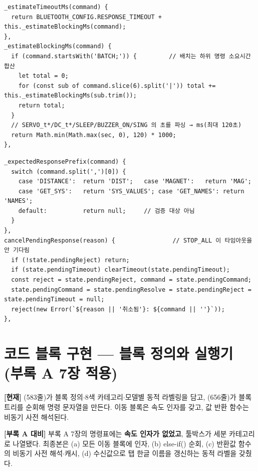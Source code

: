 \begin{verbatim}
_estimateTimeoutMs(command) {
  return BLUETOOTH_CONFIG.RESPONSE_TIMEOUT + this._estimateBlockingMs(command);
},
_estimateBlockingMs(command) {
  if (command.startsWith('BATCH;')) {         // 배치는 하위 명령 소요시간 합산
    let total = 0;
    for (const sub of command.slice(6).split('|')) total += this._estimateBlockingMs(sub.trim());
    return total;
  }
  // SERVO_t*/DC_t*/SLEEP/BUZZER_ON/SING 의 초를 파싱 → ms(최대 120초)
  return Math.min(Math.max(sec, 0), 120) * 1000;
},
\end{verbatim}

\begin{verbatim}
_expectedResponsePrefix(command) {
  switch (command.split(',')[0]) {
    case 'DISTANCE':  return 'DIST';   case 'MAGNET':   return 'MAG';
    case 'GET_SYS':   return 'SYS_VALUES'; case 'GET_NAMES': return 'NAMES';
    default:          return null;     // 검증 대상 아님
  }
},
cancelPendingResponse(reason) {                // STOP_ALL 이 타임아웃을 안 기다림
  if (!state.pendingReject) return;
  if (state.pendingTimeout) clearTimeout(state.pendingTimeout);
  const reject = state.pendingReject, command = state.pendingCommand;
  state.pendingCommand = state.pendingResolve = state.pendingReject = state.pendingTimeout = null;
  reject(new Error(`${reason || '취소됨'}: ${command || ''}`));
},
\end{verbatim}

\section{코드 블록 구현 --- 블록 정의와 실행기 (부록 A 7장 적용)}
\textbf{[현재]} (583줄)가 블록 정의$\cdot$8색 카테고리$\cdot$모델별 동적
라벨링을 담고, (656줄)가 블록 트리를 순회해 명령 문자열을 만든다.
이동 블록은 속도 인자를 갖고, 값 반환 함수는 비동기 사전 해석된다.

\smallskip
\noindent\textbf{[부록 A 대비]} 부록 A 7장의 명령표에는 \textbf{속도 인자가 없었고}, 툴박스가
세분 카테고리로 나열됐다. 최종본은 (a) 모든 이동 블록에  인자, (b)
else-if() 순회, (c) 반환값 함수의 비동기 사전 해석$\cdot$캐시, (d) 
수신값으로 탭 한글 이름을 갱신하는 동적 라벨을 갖췄다.


